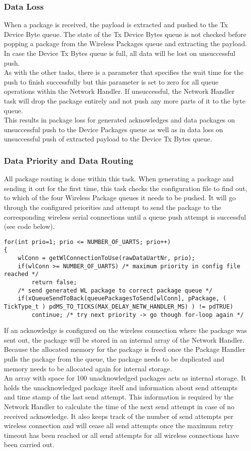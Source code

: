 \subsubsection{Data Loss}
When a package is received, the payload is extracted and pushed to the Tx Device Byte queue. The state of the Tx Device Bytes queue is not checked before popping a package from the Wireless Packages queue and extracting the payload. In case the Device Tx Bytes queue is full, all data will be lost on unsuccessful push.\\
As with the other tasks, there is a parameter that specifies the wait time for the push to finish successfully but this parameter is set to zero for all queue operations within the Network Handler. If unsuccessful, the Network Handler task will drop the package entirely and not push any more parts of it to the byte queue.\\
This results in package loss for generated acknowledges and data packages on unsuccessful push to the Device Packages queue as well as in data loss on unsuccessful push of extracted payload to the Device Tx Bytes queue.\\
\subsubsection{Data Priority and Data Routing}
All package routing is done within this task. When generating a package and sending it out for the first time, this task checks the configuration file to find out, to which of the four Wireless Package queues it needs to be pushed. It will go through the configured priorities and attempt to send the package to the corresponding wireless serial connections until a queue push attempt is successful (see code below).
\begin{lstlisting}
for(int prio=1; prio <= NUMBER_OF_UARTS; prio++)
{
    wlConn = getWlConnectionToUse(rawDataUartNr, prio);
    if(wlConn >= NUMBER_OF_UARTS) /* maximum priority in config file reached */
        return false;
    /* send generated WL package to correct package queue */
    if(xQueueSendToBack(queuePackagesToSend[wlConn], pPackage, ( TickType_t ) pdMS_TO_TICKS(MAX_DELAY_NETW_HANDLER_MS) ) != pdTRUE)
        continue; /* try next priority -> go though for-loop again */
\end{lstlisting}
If an acknowledge is configured on the wireless connection where the package was sent out, the package will be stored in an internal array of the Network Handler. Because the allocated memory for the package is freed once the Package Handler pulls the package from the queue, the package needs to be duplicated and memory needs to be allocated again for internal storage.\\
An array with space for 100 unacknowledged packages acts as internal storage. It holds the unacknowledged package itself and information about send attempts and time stamp of the last send attempt. This information is required by the Network Handler to calculate the time of the next send attempt in case of no received acknowledge. It also keeps track of the number of send attempts per wireless connection and will cease all send attempts once the maximum retry timeout has been reached or all send attempts for all wireless connections have been carried out.

